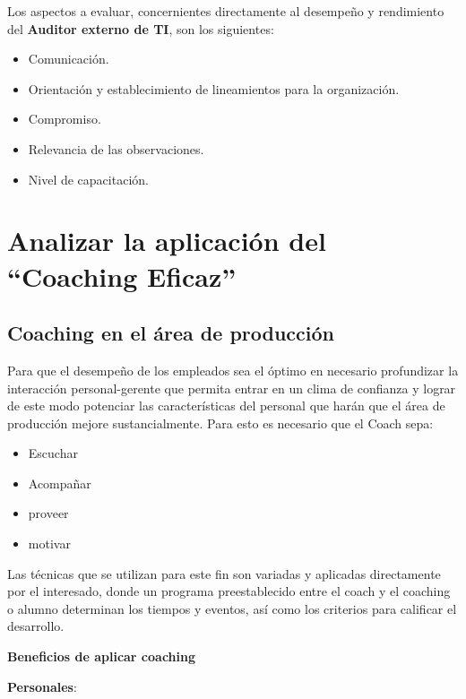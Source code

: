 Los aspectos a evaluar, concernientes directamente al desempeño y rendimiento del \textbf{Auditor externo de TI}, son los siguientes:

\begin{itemize}
    \item Comunicación.
    \item Orientación y establecimiento de lineamientos para la organización.
    \item Compromiso.
    \item Relevancia de las observaciones.
    \item Nivel de capacitación.
\end{itemize}





\newpage

    \section{Analizar la aplicación del \textbf{``Coaching Eficaz''} } %
        \subsection{Coaching en el área de producción}
		 Para que el desempeño de los empleados sea el óptimo en necesario profundizar la interacción personal-gerente que permita entrar en un clima de confianza y lograr de este modo potenciar las características del personal que harán que el área de producción mejore sustancialmente. Para esto es necesario que el Coach sepa:
        \begin{itemize}
            \item Escuchar
            \item Acompañar
            \item proveer
            \item motivar
        \end{itemize}
Las técnicas que se utilizan para este fin son variadas y aplicadas directamente por el interesado, donde un programa preestablecido entre el coach y el coaching   o alumno determinan los tiempos y eventos, así como los criterios para calificar el desarrollo. 

\textbf{Beneficios de aplicar coaching}

\textbf{Personales}:

